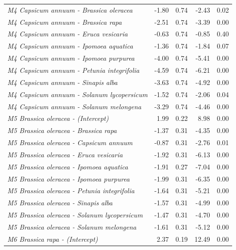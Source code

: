 \documentclass[12pt,]{article}
\begin{document}
\begin{longtable}[t]{>{\em}lrrrr}
\addlinespace
M4 Capsicum annuum - Brassica oleracea & -1.80 & 0.74 & -2.43 & 0.02\\
\addlinespace
\rowcolor{gray!6}  M4 Capsicum annuum - Brassica rapa & -2.51 & 0.74 & -3.39 & 0.00\\
\addlinespace
M4 Capsicum annuum - Eruca vesicaria & -0.63 & 0.74 & -0.85 & 0.40\\
\addlinespace
\rowcolor{gray!6}  M4 Capsicum annuum - Ipomoea aquatica & -1.36 & 0.74 & -1.84 & 0.07\\
\addlinespace
M4 Capsicum annuum - Ipomoea purpurea & -4.00 & 0.74 & -5.41 & 0.00\\
\addlinespace
\rowcolor{gray!6}  M4 Capsicum annuum - Petunia integrifolia & -4.59 & 0.74 & -6.21 & 0.00\\
\addlinespace
M4 Capsicum annuum - Sinapis alba & -3.63 & 0.74 & -4.92 & 0.00\\
\addlinespace
\rowcolor{gray!6}  M4 Capsicum annuum - Solanum lycopersicum & -1.52 & 0.74 & -2.06 & 0.04\\
\addlinespace
M4 Capsicum annuum - Solanum melongena & -3.29 & 0.74 & -4.46 & 0.00\\
\addlinespace
\rowcolor{gray!6}  M5 Brassica oleracea - (Intercept) & 1.99 & 0.22 & 8.98 & 0.00\\
\addlinespace
M5 Brassica oleracea - Brassica rapa & -1.37 & 0.31 & -4.35 & 0.00\\
\addlinespace
\rowcolor{gray!6}  M5 Brassica oleracea - Capsicum annuum & -0.87 & 0.31 & -2.76 & 0.01\\
\addlinespace
M5 Brassica oleracea - Eruca vesicaria & -1.92 & 0.31 & -6.13 & 0.00\\
\addlinespace
\rowcolor{gray!6}  M5 Brassica oleracea - Ipomoea aquatica & -1.91 & 0.27 & -7.04 & 0.00\\
\addlinespace
M5 Brassica oleracea - Ipomoea purpurea & -1.99 & 0.31 & -6.35 & 0.00\\
\addlinespace
\rowcolor{gray!6}  M5 Brassica oleracea - Petunia integrifolia & -1.64 & 0.31 & -5.21 & 0.00\\
\addlinespace
M5 Brassica oleracea - Sinapis alba & -1.57 & 0.31 & -4.99 & 0.00\\
\addlinespace
\rowcolor{gray!6}  M5 Brassica oleracea - Solanum lycopersicum & -1.47 & 0.31 & -4.70 & 0.00\\
\addlinespace
M5 Brassica oleracea - Solanum melongena & -1.61 & 0.31 & -5.12 & 0.00\\
\addlinespace
\rowcolor{gray!6}  M6 Brassica rapa - (Intercept) & 2.37 & 0.19 & 12.49 & 0.00\\

\end{longtable}
\end{document}
